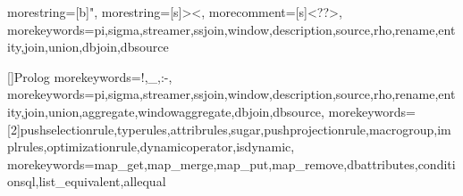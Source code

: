 
{
  morestring=[b]",
  morestring=[s]{>}{<},
  morecomment=[s]{<?}{?>},
  morekeywords={pi,sigma,streamer,ssjoin,window,description,source,rho,rename,entity,join,union,dbjoin,dbsource}
}

[]{Prolog}{
   morekeywords={!,\_,:-},
   morekeywords={pi,sigma,streamer,ssjoin,window,description,source,rho,rename,entity,join,union,aggregate,windowaggregate,dbjoin,dbsource},
   morekeywords=[2]{pushselectionrule,typerules,attribrules,sugar,pushprojectionrule,macrogroup,implrules,optimizationrule,dynamicoperator,isdynamic},
   morekeywords={map_get,map_merge,map_put,map_remove,dbattributes,conditionsql,list_equivalent,allequal}
}
\def\sql#1{\lstinline[language=SQL,basicstyle=\normalsize\ttfamily\upshape]|#1|}